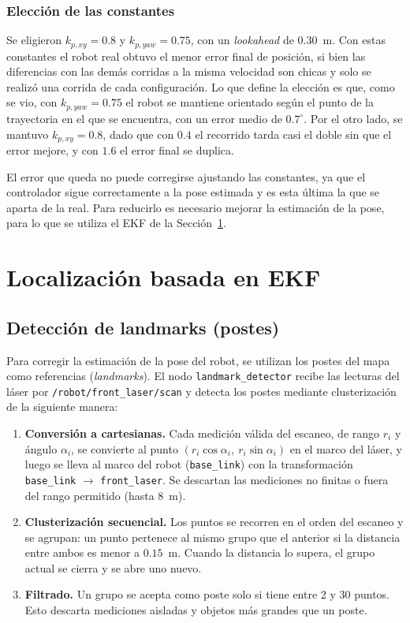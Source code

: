 \documentclass[11pt,a4paper]{article}
\begin{document}
\subsubsection{Elección de las constantes}

Se eligieron $k_{p,xy} = 0.8$ y $k_{p,yaw} = 0.75$, con un \emph{lookahead} de $0.30$~m. Con estas constantes el robot real obtuvo el menor error final de posición, si bien las diferencias con las demás corridas a la misma velocidad son chicas y solo se realizó una corrida de cada configuración. Lo que define la elección es que, como se vio, con $k_{p,yaw} = 0.75$ el robot se mantiene orientado según el punto de la trayectoria en el que se encuentra, con un error medio de $0.7^\circ$. Por el otro lado, se mantuvo $k_{p,xy} = 0.8$, dado que con $0.4$ el recorrido tarda casi el doble sin que el error mejore, y con $1.6$ el error final se duplica.

El error que queda no puede corregirse ajustando las constantes, ya que el controlador sigue correctamente a la pose estimada y es esta última la que se aparta de la real. Para reducirlo es necesario mejorar la estimación de la pose, para lo que se utiliza el EKF de la Sección~\ref{sec:ekf}.

\section{Localización basada en EKF}
\label{sec:ekf}
\subsection{Detección de landmarks (postes)}
\label{sec:landmarks}

Para corregir la estimación de la pose del robot, se utilizan los postes del mapa como referencias (\emph{landmarks}). El nodo \texttt{landmark\_detector} recibe las lecturas del láser por \texttt{/robot/front\_laser/scan} y detecta los postes mediante clusterización de la siguiente manera:

\begin{enumerate}
    \item \textbf{Conversión a cartesianas.} Cada medición válida del escaneo, de rango $r_i$ y ángulo $\alpha_i$, se convierte al punto $(r_i\cos\alpha_i,\ r_i\sin\alpha_i)$ en el marco del láser, y luego se lleva al marco del robot (\texttt{base\_link}) con la transformación \texttt{base\_link} $\rightarrow$ \texttt{front\_laser}. Se descartan las mediciones no finitas o fuera del rango permitido (hasta 8~m).
    \item \textbf{Clusterización secuencial.} Los puntos se recorren en el orden del escaneo y se agrupan: un punto pertenece al mismo grupo que el anterior si la distancia entre ambos es menor a $0.15$~m. Cuando la distancia lo supera, el grupo actual se cierra y se abre uno nuevo.
    \item \textbf{Filtrado.} Un grupo se acepta como poste solo si tiene entre 2 y 30 puntos. Esto descarta mediciones aisladas y objetos más grandes que un poste.
\end{enumerate}
\end{document}
